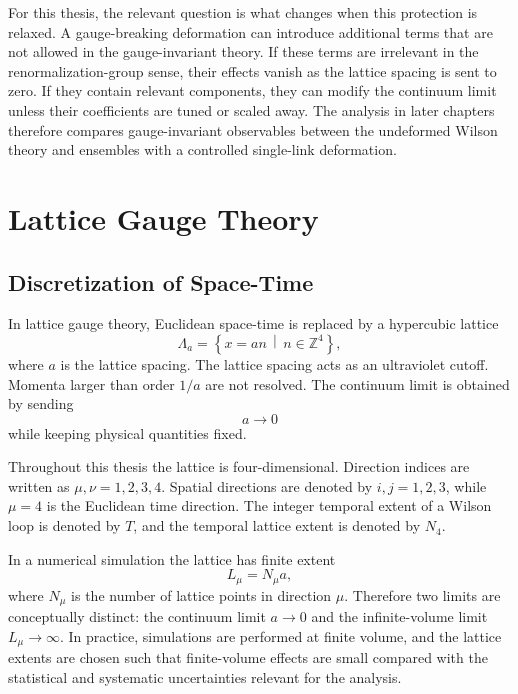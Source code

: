 \documentclass[12pt,a4paper,oneside,numbers=noenddot]{scrreprt}
\newcommand{\latspacing}{a}
\begin{document}
For this thesis, the relevant question is what changes when this protection is
relaxed. A gauge-breaking deformation can introduce additional terms that are
not allowed in the gauge-invariant theory. If these terms are irrelevant in the
renormalization-group sense, their effects vanish as the lattice spacing is
sent to zero. If they contain relevant components, they can modify the
continuum limit unless their coefficients are tuned or scaled away. The
analysis in later chapters therefore compares gauge-invariant observables
between the undeformed Wilson theory and ensembles with a controlled
single-link deformation.

\section{Lattice Gauge Theory}
\label{sec:lattice-gauge-theory}

\subsection{Discretization of Space-Time}
\label{subsec:discretization}

In lattice gauge theory, Euclidean space-time is replaced by a hypercubic
lattice
\begin{equation}
  \Lambda_{\latspacing}
  =
  \left\{
    x = \latspacing n
    \,\middle|\,
    n \in \mathbb{Z}^4
  \right\},
\end{equation}
where $\latspacing$ is the lattice spacing. The lattice spacing acts as an
ultraviolet cutoff. Momenta larger than order $1/\latspacing$ are not resolved.
The continuum limit is obtained by sending
\begin{equation}
  \latspacing \to 0
\end{equation}
while keeping physical quantities fixed.

Throughout this thesis the lattice is four-dimensional. Direction indices are
written as $\mu,\nu=1,2,3,4$. Spatial directions are denoted by
$i,j=1,2,3$, while $\mu=4$ is the Euclidean time direction. The integer
temporal extent of a Wilson loop is denoted by $T$, and the temporal lattice
extent is denoted by $N_4$.

In a numerical simulation the lattice has finite extent
\begin{equation}
  L_\mu = N_\mu \latspacing ,
\end{equation}
where \(N_\mu\) is the number of lattice points in direction \(\mu\). Therefore
two limits are conceptually distinct: the continuum limit \(\latspacing \to 0\)
and the infinite-volume limit \(L_\mu \to \infty\). In practice, simulations are
performed at finite volume, and the lattice extents are chosen such that
finite-volume effects are small compared with the statistical and systematic
uncertainties relevant for the analysis.
\end{document}
